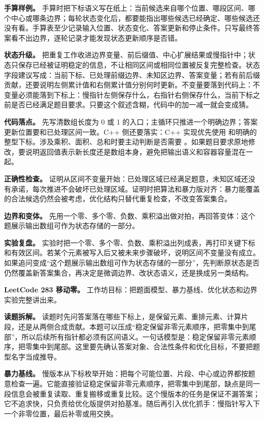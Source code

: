 \textbf{手算样例。} 手算时把下标语义写在纸上：当前候选来自哪个位置、哪段区间、哪个中心或哪条边界；每轮状态变化后，都要能指出哪些候选已经确定、哪些候选还没有看。手算表至少记录输入位置、状态变化、答案更新和停止条件。只写最终答案看不出边界，逐轮记录才能发现状态更新顺序是否错。

\textbf{状态升级。} 把重复工作收进边界变量、前后缀值、中心扩展结果或慢指针中；状态只保存已经被证明稳定的信息，不让相同区间或相同位置被反复完整检查。状态字段建议写成：当前下标、已处理前缀边界、未知区边界、答案变量；若有前后缀贡献，还要说明左侧累计值和右侧累计值分别何时更新。不变量要落到代码上：不变量必须能落到下标上：慢指针左侧保存什么，右指针右侧保存什么，当前下标之前是否已经满足题目要求。只要这个叙述含糊，代码中的加一减一就会变成猜。

\textbf{代码落点。} 先写清数组长度为 0 或 1 的入口；主循环只推进一个明确边界；答案更新位置要和已处理区间一致。C++ 侧还要落实：C++ 实现优先使用  和明确的整型下标。涉及乘积、面积、总和时要主动判断是否需要 。如果题目要求原地修改，要说明返回值表示新长度还是数组本身，避免把输出语义和容器容量混在一起。

\textbf{正确性检查。} 证明从区间不变量开始：已处理区域已经满足题意，未知区域还没有承诺，每次推进不会破坏已处理区域。证明时把算法和暴力版对齐：暴力能覆盖的合法候选仍然会被考虑，优化结构只替代重复检查，不改变答案集合。

\textbf{边界和变体。} 先用一个零、多个零、负数、乘积溢出做对拍，再回答变体：这个题展示输出数组可作为状态存储的一部分。

\textbf{实验复盘。} 实验时把一个零、多个零、负数、乘积溢出列成表，再打印关键下标和有效区间。若某个元素被写入后又被未来步骤破坏，说明区间不变量没有成立。如果追问变成“这个题展示输出数组可作为状态存储的一部分”，先判断原状态是否仍然覆盖新答案集合，再决定是微调边界、改状态语义，还是换成另一类结构。

\noindent\textbf{LeetCode 283 移动零。} 工作坊目标：把题面模型、暴力基线、优化状态和边界实验完整讲出来。

\textbf{读题拆解。} 读题时先问答案落在哪些下标上，是保留元素、重排元素、计算片段，还是从两侧合成贡献。本题可以压成“稳定保留非零元素顺序，把零集中到尾部”，所以后续所有指针都必须有区间语义。一句话模型是：稳定保留非零元素顺序，把零集中到尾部。这里要先确认答案对象、合法性条件和优化目标，不要把题型名字当成推导。

\textbf{暴力基线。} 慢版本从下标枚举开始：把每个可能位置、片段、中心或边界都按题意检查一遍。它能直接验证稳定保留非零元素顺序，把零集中到尾部，缺点是同一段信息会被重复读取、重复搬移或重复比较。这个慢版本的任务是保证不漏答案；它不追求快，只负责给优化版提供对拍基准。随后再引入优化抓手：慢指针写入下一个非零位置，最后补零或用交换。

